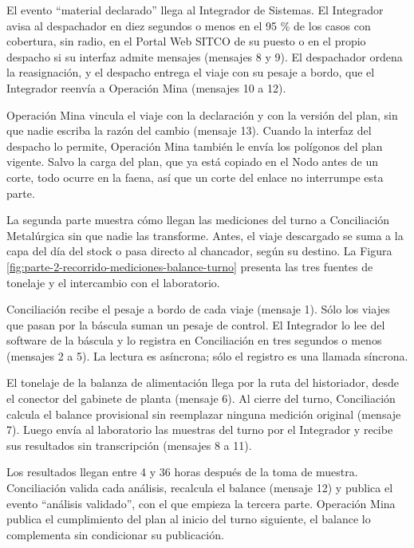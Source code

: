 \documentclass[subdoc]{../../comun/overfore}
\begin{document}
El evento “material declarado” llega al Integrador de Sistemas. El Integrador avisa al despachador en diez segundos o menos en el 95 \% de los casos con cobertura, sin radio, en el Portal Web SITCO de su puesto o en el propio despacho si su interfaz admite mensajes (mensajes 8 y 9). El despachador ordena la reasignación, y el despacho entrega el viaje con su pesaje a bordo, que el Integrador reenvía a Operación Mina (mensajes 10 a 12).

Operación Mina vincula el viaje con la declaración y con la versión del plan, sin que nadie escriba la razón del cambio (mensaje 13). Cuando la interfaz del despacho lo permite, Operación Mina también le envía los polígonos del plan vigente. Salvo la carga del plan, que ya está copiado en el Nodo antes de un corte, todo ocurre en la faena, así que un corte del enlace no interrumpe esta parte.

La segunda parte muestra cómo llegan las mediciones del turno a Conciliación Metalúrgica sin que nadie las transforme. Antes, el viaje descargado se suma a la capa del día del stock o pasa directo al chancador, según su destino. La Figura \ref{fig:parte-2-recorrido-mediciones-balance-turno} presenta las tres fuentes de tonelaje y el intercambio con el laboratorio.

Conciliación recibe el pesaje a bordo de cada viaje (mensaje 1). Sólo los viajes que pasan por la báscula suman un pesaje de control. El Integrador lo lee del software de la báscula y lo registra en Conciliación en tres segundos o menos (mensajes 2 a 5). La lectura es asíncrona; sólo el registro es una llamada síncrona.

El tonelaje de la balanza de alimentación llega por la ruta del historiador, desde el conector del gabinete de planta (mensaje 6). Al cierre del turno, Conciliación calcula el balance provisional sin reemplazar ninguna medición original (mensaje 7). Luego envía al laboratorio las muestras del turno por el Integrador y recibe sus resultados sin transcripción (mensajes 8 a 11).

Los resultados llegan entre 4 y 36 horas después de la toma de muestra. Conciliación valida cada análisis, recalcula el balance (mensaje 12) y publica el evento “análisis validado”, con el que empieza la tercera parte. Operación Mina publica el cumplimiento del plan al inicio del turno siguiente, el balance lo complementa sin condicionar su publicación.
\end{document}
